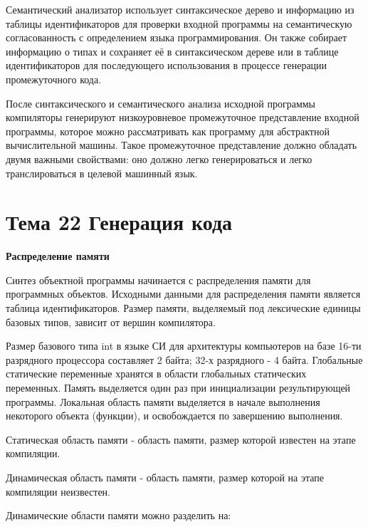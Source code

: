 Семантический анализатор использует синтаксическое дерево и информацию из таблицы идентификаторов для проверки входной программы на семантическую согласованность с определением языка программирования. Он также собирает информацию о типах и сохраняет её в синтаксическом дереве или в таблице идентификаторов для последующего использования в процессе генерации промежуточного кода.

После синтаксического и семантического анализа исходной программы компиляторы генерируют низкоуровневое промежуточное представление входной программы, которое можно рассматривать как программу для абстрактной вычислительной машины. Такое промежуточное представление должно обладать двумя важными свойствами: оно должно легко генерироваться и легко транслироваться в целевой машинный язык.

\newpage 
\chapter{Тема 22 Генерация кода}

\begin{center}{\bfseries Распределение памяти}
\end{center}

Синтез объектной программы начинается с распределения памяти для программных объектов. Исходными данными для распределения памяти является таблица идентификаторов. Размер памяти, выделяемый под лексические единицы базовых типов, зависит от вершин компилятора.

Размер базового типа int в языке СИ для архитектуры компьютеров на базе 16-ти разрядного процессора составляет 2 байта; 32-х разрядного - 4 байта. Глобальные статические переменные хранятся в области глобальных статических переменных. Память выделяется один раз при инициализации результирующей программы. Локальная область памяти выделяется в начале выполнения некоторого объекта (функции), и освобождается по завершению выполнения.

\begin{opr}
  Статическая область памяти - область памяти, размер которой известен на этапе компиляции.
\end{opr}

\begin{opr}
  Динамическая область памяти - область памяти, размер которой на этапе компиляции неизвестен.
\end{opr}

Динамические области памяти можно разделить на:

